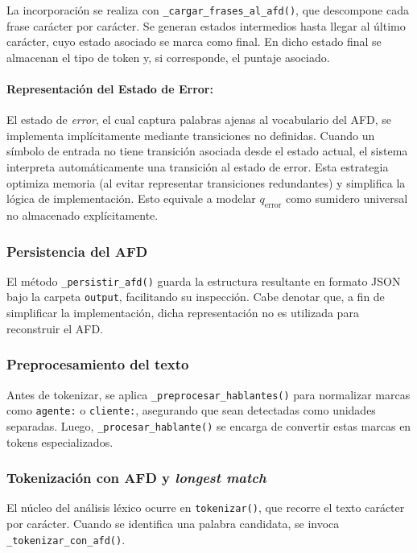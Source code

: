 La incorporación se realiza con \texttt{\_cargar\_frases\_al\_afd()}, que descompone cada frase
carácter por carácter. Se generan estados intermedios hasta llegar al último carácter, cuyo
estado asociado se marca como final. En dicho estado final se almacenan el tipo de token y, si
corresponde, el puntaje asociado.

\paragraph{\footnotesize{Representación del Estado de Error:}}
El estado de \textit{error}, el cual captura palabras ajenas al vocabulario del AFD, se
implementa implícitamente mediante transiciones no definidas. Cuando un símbolo de entrada no
tiene transición asociada desde el estado actual, el sistema interpreta automáticamente una
transición al estado de error. Esta estrategia optimiza memoria (al evitar representar
transiciones redundantes) y simplifica la lógica de implementación. Esto equivale a modelar
$q_{\text{error}}$ como sumidero universal no almacenado explícitamente.

\subsubsection{Persistencia del AFD}
El método \texttt{\_persistir\_afd()} guarda la estructura resultante en formato JSON bajo la
carpeta \texttt{output}, facilitando su inspección. Cabe denotar que, a fin de simplificar la
implementación, dicha representación no es utilizada para reconstruir el AFD.

\subsubsection{Preprocesamiento del texto}
Antes de tokenizar, se aplica \texttt{\_preprocesar\_hablantes()} para normalizar marcas como
\texttt{agente:} o \texttt{cliente:}, asegurando que sean detectadas como unidades separadas.
Luego, \texttt{\_procesar\_hablante()} se encarga de convertir estas marcas en tokens
especializados.

\subsubsection{Tokenización con AFD y \textit{longest match}}
El núcleo del análisis léxico ocurre en \texttt{tokenizar()}, que recorre el texto carácter por
carácter. Cuando se identifica una palabra candidata, se invoca
\texttt{\_tokenizar\_con\_afd()}.

